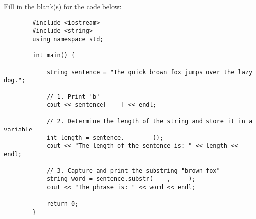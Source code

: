 \begin{problem}
    Fill in the blank(s) for the code below:
    \begin{verbatim}
        #include <iostream>
        #include <string>
        using namespace std;
        
        int main() {
            
            string sentence = "The quick brown fox jumps over the lazy dog.";
        
            // 1. Print 'b'
            cout << sentence[____] << endl; 
        
            // 2. Determine the length of the string and store it in a variable
            int length = sentence.________();
            cout << "The length of the sentence is: " << length << endl;
        
            // 3. Capture and print the substring "brown fox"
            string word = sentence.substr(____, ____);
            cout << "The phrase is: " << word << endl;
        
            return 0;
        }

    \end{verbatim}
\end{problem}


        
        
        
        
        
        
    



